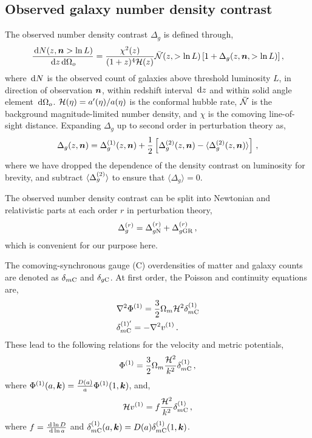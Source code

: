 \subsection{Observed galaxy number density contrast}

The observed number density contrast $\Delta_g$ is defined through, 
\begin{equation}
	\frac{\,\mathrm{d} N(z, \bm {n} > \ln L)}{\,\mathrm{d} z \,\mathrm{d} \Omega_o} = \frac{\chi^2(z)}{(1 + z)^4 \mathcal{H}(z)} \bar{\mathcal{N}}(z, > \ln L) \left[ 1 + \Delta_g(z, \bm {n}, >\ln L) \right],
\end{equation}
where $\,\mathrm{d} N$ is the observed count of galaxies above threshold luminosity $L$, in direction of observation $\bm {n}$, within redshift interval $\,\mathrm{d} z$ and within solid angle element $\,\mathrm{d} \Omega_o$. $\mathcal{H}(\eta) = a'(\eta)/a(\eta)$ is the conformal hubble rate, $\bar{\mathcal{N}}$ is the background magnitude-limited number density, and $\chi$ is the comoving line-of-sight distance. Expanding $\Delta_g$ up to second order in perturbation theory as, 
\begin{equation}
	\Delta_g(z,\bm {n}) = \Delta_g^{(1)}(z, \bm {n}) + \frac{1}{2} \left[ \Delta_g^{(2)}(z,\bm {n}) - \langle \Delta_g^{(2)}(z,\bm {n})\rangle \right]\,,
\end{equation}
where we have dropped the dependence of the density contrast on luminosity for brevity, and subtract $\langle \Delta_g^{(2)} \rangle$ to ensure that $\langle \Delta_g \rangle = 0$. 

The observed number density contrast can be split into Newtonian and relativistic parts at each order $r$ in perturbation theory,
\begin{equation}
	\Delta_g^{(r)} = \Delta_{g \mathrm{N}}^{(r)} + \Delta_{g \mathrm{GR}}^{(r)}\,,
\end{equation}
which is convenient for our purpose here.

The comoving-synchronous gauge (C) overdensities of matter and galaxy counts are denoted as $\delta_{m\mathrm{C}}$ and $\delta_{g\mathrm{C}}$. At first order, the Poisson and continuity equations are,
\begin{align}
	&\nabla^2 \Phi^{(1)} = \frac{3}{2} \Omega_m \mathcal{H}^2 \delta_{m\mathrm{C}}^{(1)} \\
	&\delta_{m\mathrm{C}}^{{(1)}'} = - \nabla^2 v^{(1)}\,.
\end{align}
These lead to the following relations for the velocity and metric potentials,
\begin{equation}
	\Phi^{(1)} = \frac{3}{2} \Omega_m \frac{\mathcal{H}^2}{k^2} \delta_{m\mathrm{C}}^{(1)}\,,
\end{equation}
where $\Phi^{(1)}(a,\bm {k}) = \frac{D(a)}{a} \Phi^{(1)}(1,\bm {k})$, and,
\begin{equation}\label{eq:scdepvel}
	\mathcal{H} v^{(1)} = f \frac{\mathcal{H}^2}{k^2} \delta^{(1)}_{m\mathrm{C}}\,,
\end{equation}
where $f = \frac{\,\mathrm{d} \ln D}{\,\mathrm{d} \ln a}$ and $\delta^{(1)}_{m\mathrm{C}}(a,\bm {k}) = D(a) \delta^{(1)}_{m\mathrm{C}}(1,\bm {k})$. 

